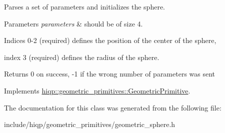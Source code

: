 Parses a set of parameters and initializes the sphere. 


\begin{DoxyParams}{Parameters}
{\em parameters} & should be of size 4. \par
 Indices 0-\/2 (required) defines the position of the center of the sphere, \par
 index 3 (required) defines the radius of the sphere.\\
\hline
\end{DoxyParams}
\begin{DoxyReturn}{Returns}
0 on success, -\/1 if the wrong number of parameters was sent 
\end{DoxyReturn}


Implements \hyperlink{classhiqp_1_1geometric__primitives_1_1GeometricPrimitive_a3697e5afb0121715280da649b8bd711d}{hiqp\-::geometric\-\_\-primitives\-::\-Geometric\-Primitive}.



The documentation for this class was generated from the following file\-:\begin{DoxyCompactItemize}
\item 
include/hiqp/geometric\-\_\-primitives/geometric\-\_\-sphere.\-h\end{DoxyCompactItemize}
